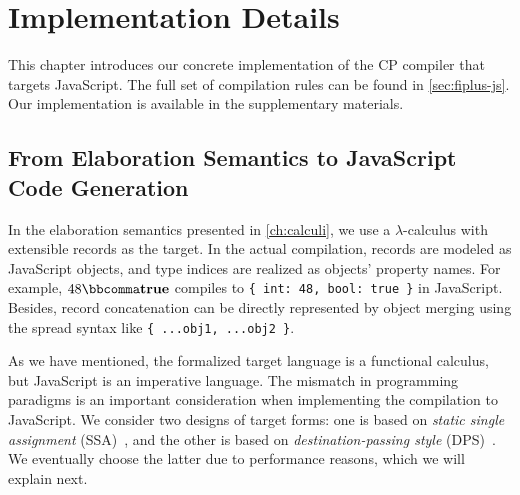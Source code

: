 \chapter{Implementation Details} \label{ch:compilation}

This chapter introduces our concrete implementation of the CP compiler that
targets JavaScript. The full set of compilation rules can be found in
\autoref{sec:fiplus-js}. Our implementation is available in the supplementary
materials.

\section{From Elaboration Semantics to JavaScript Code Generation}

In the elaboration semantics presented in \autoref{ch:calculi}, we use a
$\lambda$-calculus with extensible records as the target. In the actual
compilation, records are modeled as JavaScript objects, and type indices are
realized as objects' property names. For example, $48  \bbcomma   \mathbf{true} $ compiles to
\lstinline|{ int: 48, bool: true }| in JavaScript. Besides, record concatenation
can be directly represented by object merging using the spread syntax like
\lstinline|{ ...obj1, ...obj2 }|.

As we have mentioned, the formalized target language is a functional calculus,
but JavaScript is an imperative language. The mismatch in programming paradigms
is an important consideration when implementing the compilation to JavaScript.
We consider two designs of target forms: one is based on \emph{static single
assignment} (SSA)~\citep{cytron1991efficiently}, and the other is based on
\emph{destination-passing style} (DPS)~\citep{shaikhha2017destination}. We
eventually choose the latter due to performance reasons, which we will explain
next.

